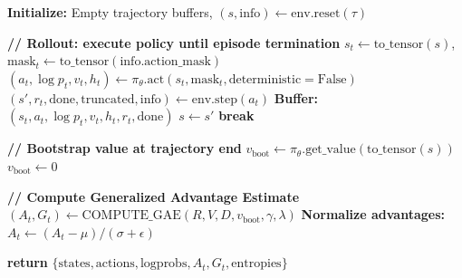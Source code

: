 \documentclass[11pt,a4paper]{article}
\begin{document}
\clearpage


\begin{algorithm}[h]
\caption{COLLECT\_EPISODE: Single Episode with Advantage Estimation}
\label{alg:collect_ep}
\begin{algorithmic}[1]



\State \textbf{Initialize:} Empty trajectory buffers, $(s, \text{info}) \leftarrow \text{env.reset}(\tau)$

\State \textbf{// Rollout: execute policy until episode termination}
	\State $s_t \leftarrow \text{to\_tensor}(s)$, $\text{mask}_t \leftarrow \text{to\_tensor}(\text{info.action\_mask})$
	\State $(a_t, \log p_t, v_t, h_t) \leftarrow \pi_\theta.\text{act}(s_t, \text{mask}_t, \text{deterministic}=\text{False})$
	\State $(s', r_t, \text{done}, \text{truncated}, \text{info}) \leftarrow \text{env.step}(a_t)$
	\State \textbf{Buffer:} $(s_t, a_t, \log p_t, v_t, h_t, r_t, \text{done})$
	\State $s \leftarrow s'$
		\State \textbf{break}
	\EndIf
\EndWhile

\State \textbf{// Bootstrap value at trajectory end}
	\State $v_{\text{boot}} \leftarrow \pi_\theta.\text{get\_value}(\text{to\_tensor}(s))$
\Else
	\State $v_{\text{boot}} \leftarrow 0$
\EndIf

\State \textbf{// Compute Generalized Advantage Estimate}
\State $(A_t, G_t) \leftarrow \text{COMPUTE\_GAE}(R, V, D, v_{\text{boot}}, \gamma, \lambda)$
\State \textbf{Normalize advantages:} $A_t \leftarrow (A_t - \mu) / (\sigma + \epsilon)$

\State \textbf{return} $\{\text{states}, \text{actions}, \text{logprobs}, A_t, G_t, \text{entropies}\}$

\end{algorithmic}
\end{algorithm}
\end{document}
